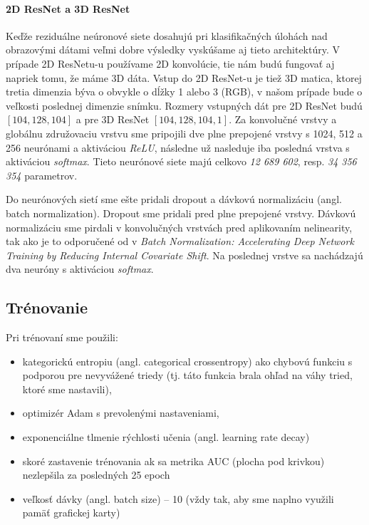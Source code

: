 \paragraph{2D ResNet a 3D ResNet} Keďže reziduálne neúronové siete dosahujú pri klasifikačných úlohách nad obrazovými dátami veľmi dobre výsledky vyskúšame aj tieto architektúry. V prípade 2D ResNetu-u používame 2D konvolúcie, tie nám budú fungovať aj napriek tomu, že máme 3D dáta. Vstup do 2D ResNet-u je tiež 3D matica, ktorej tretia dimenzia býva o obvykle o dĺžky 1 alebo 3 (RGB), v našom prípade bude o veľkosti poslednej dimenzie snímku. Rozmery vstupných dát pre 2D ResNet budú $[104, 128, 104]$ a pre 3D ResNet $[104, 128, 104, 1]$. Za konvolučné vrstvy a globálnu združovaciu vrstvu sme pripojili dve plne prepojené vrstvy s 1024, 512 a 256 neurónami a aktiváciou \textit{ReLU}, následne už nasleduje iba posledná vrstva s aktiváciou \textit{softmax}. Tieto neurónové siete majú celkovo \textit{12 689 602}, resp. \textit{34 356 354} parametrov.

Do neurónových sietí sme ešte pridali dropout a dávkovú normalizáciu (angl. batch normalization). Dropout sme pridali pred plne prepojené vrstvy. Dávkovú normalizáciu sme pirdali v konvolučných vrstvách pred aplikovaním nelinearity, tak ako je to odporučené od \citeauthor*{ioffe2015batch} v \textit{Batch Normalization: Accelerating Deep Network Training by Reducing Internal Covariate Shift}. Na poslednej vrstve sa nachádzajú dva neuróny s aktiváciou \textit{softmax}.

\subsection{Trénovanie}

Pri trénovaní sme použili:

\begin{itemize}
    \item kategorickú entropiu (angl. categorical crossentropy) ako chybovú funkciu s podporou pre nevyvážené triedy (tj. táto funkcia brala ohľad na váhy tried, ktoré sme nastavili),
    \item optimizér Adam s prevolenými nastaveniami,
    \item exponenciálne tlmenie rýchlosti učenia (angl. learning rate decay)
    \item skoré zastavenie trénovania ak sa metrika AUC (plocha pod krivkou) nezlepšila za posledných 25 epoch
    \item veľkosť dávky (angl. batch size) -- 10 (vždy tak, aby sme naplno využili pamäť grafickej karty)
\end{itemize}


